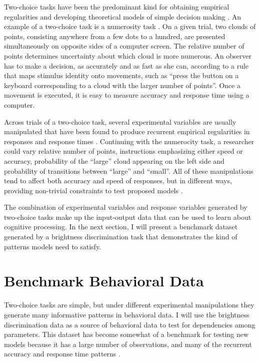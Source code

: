 \documentclass[12pt]{report}
\begin{document}
Two-choice tasks have been the predominant kind for obtaining empirical regularities and developing theoretical models of simple decision making \citep{Lam1968,Vic1979,Luc1986,RatSmi2004,RatMck2008,Wag2009}.   
An example of a two-choice task is a numerosity task \citep{RatLov2012}. On a given trial, two clouds of points, consisting anywhere from a few dots to a hundred, are presented simultaneously on opposite sides of a computer screen. The relative number of points determines uncertainty about which cloud is more numerous. An observer has to make a decision, as accurately and as fast as she can, according to a rule that maps stimulus identity onto movements, such as ``press the button on a keyboard corresponding to a cloud with the larger number of points''. Once a movement is executed, it is easy to measure accuracy and response time using a computer.

Across trials of a two-choice task, several experimental variables are usually manipulated that have been found to produce recurrent empirical regularities in responses and response times \citep{Luc1986}. Continuing with the numerocity task, a researcher could vary relative number of points, instructions emphasizing either speed or accuracy, probability of the ``large'' cloud appearing on the left side and probability of transitions between ``large'' and ``small''. All of these manipulations tend to affect both accuracy and speed of responses, but in different ways, providing non-trivial constraints to test proposed models \citep{Vic1979,TowAsh1983}.

The combination of experimental variables and response variables generated by two-choice tasks make up the input-output data that can be used to learn about cognitive processing. In the next section, I will present a benchmark dataset generated by a brightness discrimination task that demonstrates the kind of patterns models need to satisfy.
    
\section{Benchmark Behavioral Data}
Two-choice tasks are simple, but under different experimental manipulations they generate many informative patterns in behavioral data. I will use the \citet{RatRou1998} brightness discrimination data as a source of behavioral data to test for dependencies among parameters. This dataset has become somewhat of a benchmark for testing new models because it has a large number of observations, and many of the recurrent accuracy and response time patterns \citep{VanTue2008,BroHea2008,VanTue2011,VerTue2014}.
\end{document}
